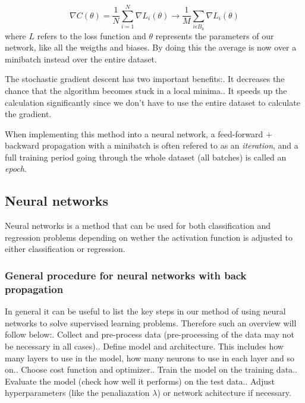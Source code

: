 \documentclass[a4paper,12pt]{article}
\begin{document}
\begin{equation}
    \nabla C(\theta) = \frac{1}{N} \sum_{i=1}^N{\nabla L_i (\theta)} \rightarrow \frac{1}{M} \sum_{i \epsilon B_k} \nabla L_i(\theta)
\end{equation}
where $L$ refers to the loss function and $\theta$ represents the parameters of our network, like all the weigths and biases. By doing this the average is now over a minibatch instead over the entire dataset.\newline

The stochastic gradient descent has two important benefits:. It decreases the chance that the algorithm becomes stuck in a local minima.. It speeds up the calculation significantly since we don't have to use the entire dataset to calculate the gradient.\newline

When implementing this method into a neural network, a feed-forward + backward propagation with a minibatch is often refered to as an \emph{iteration}, and a full training period going through the whole dataset (all batches) is called an \emph{epoch}.

\subsection{Neural networks}
Neural networks is a method that can be used for both classification and regression problems depending on wether the activation function is adjusted to either classification or regression.

\subsubsection{General procedure for neural networks with back propagation}
In general it can be useful to list the key steps in our method of using neural networks to solve supervised learning problems. Therefore such an overview will follow below:. Collect and pre-process data (pre-processing of the data may not be necessary in all cases).. Define model and architecture. This includes how many layers to use in the model, how many neurons to use in each layer and so on.. Choose cost function and optimizer.. Train the model on the training data.. Evaluate the model (check how well it performs) on the test data.. Adjust hyperparameters (like the penaliazation $\lambda$) or network achitecture if necessary.
\end{document}
